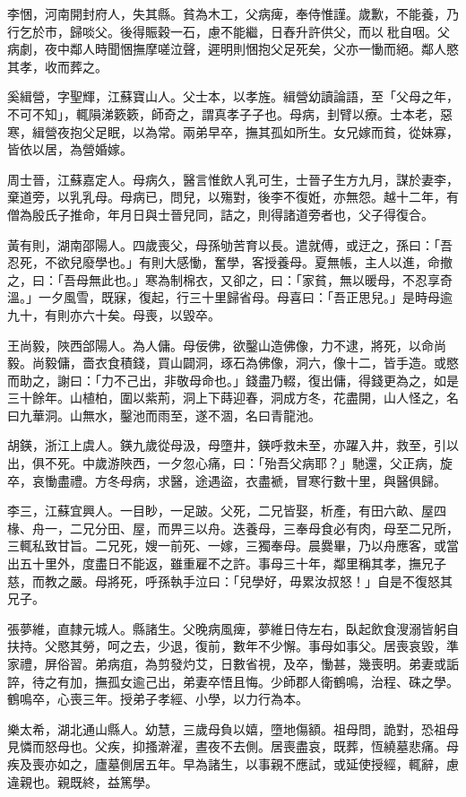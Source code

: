 \begin{pinyinscope}
李悃，河南開封府人，失其縣。貧為木工，父病痺，奉侍惟謹。歲歉，不能養，乃行乞於市，歸啖父。後得賑穀一石，慮不能繼，日舂升許供父，而以秕自咽。父病劇，夜中鄰人時聞悃撫摩嗟泣聲，遲明則悃抱父足死矣，父亦一慟而絕。鄰人愍其孝，收而葬之。

奚緝營，字聖輝，江蘇寶山人。父士本，以孝旌。緝營幼讀論語，至「父母之年，不可不知」，輒隕涕簌簌，師奇之，謂真孝子子也。母病，刲臂以療。士本老，惡寒，緝營夜抱父足眠，以為常。兩弟早卒，撫其孤如所生。女兄嫁而貧，從妹寡，皆依以居，為營婚嫁。

周士晉，江蘇嘉定人。母病久，醫言惟飲人乳可生，士晉子生方九月，謀於妻李，棄道旁，以乳乳母。母病已，問兒，以殤對，後李不復姙，亦無怨。越十二年，有僧為殷氏子推命，年月日與士晉兒同，詰之，則得諸道旁者也，父子得復合。

黃有則，湖南邵陽人。四歲喪父，母孫劬苦育以長。遣就傅，或迂之，孫曰：「吾忍死，不欲兒廢學也。」有則大感慟，奮學，客授養母。夏無帳，主人以進，命撤之，曰：「吾母無此也。」寒為制棉衣，又卻之，曰：「家貧，無以暖母，不忍享奇溫。」一夕風雪，既寐，復起，行三十里歸省母。母喜曰：「吾正思兒。」是時母逾九十，有則亦六十矣。母喪，以毀卒。

王尚毅，陜西郃陽人。為人傭。母佞佛，欲鑿山造佛像，力不逮，將死，以命尚毅。尚毅傭，嗇衣食積錢，買山闢洞，琢石為佛像，洞六，像十二，皆手造。或愍而助之，謝曰：「力不己出，非敬母命也。」錢盡乃輟，復出傭，得錢更為之，如是三十餘年。山植柏，圍以紫荊，洞上下蒔迎春，洞成方冬，花盡開，山人怪之，名曰九華洞。山無水，鑿池而雨至，遂不涸，名曰青龍池。

胡鍈，浙江上虞人。鍈九歲從母汲，母墮井，鍈呼救未至，亦躍入井，救至，引以出，俱不死。中歲游陜西，一夕忽心痛，曰：「殆吾父病耶？」馳還，父正病，旋卒，哀慟盡禮。方冬母病，求醫，途遇盜，衣盡褫，冒寒行數十里，與醫俱歸。

李三，江蘇宜興人。一目眇，一足跛。父死，二兄皆娶，析產，有田六畝、屋四椽、舟一，二兄分田、屋，而畀三以舟。迭養母，三奉母食必有肉，母至二兄所，三輒私致甘旨。二兄死，嫂一前死、一嫁，三獨奉母。晨爨畢，乃以舟應客，或當出五十里外，度盡日不能返，雖重雇不之許。事母三十年，鄰里稱其孝，撫兄子慈，而教之嚴。母將死，呼孫執手泣曰：「兒學好，毋累汝叔怒！」自是不復怒其兄子。

張夢維，直隸元城人。縣諸生。父晚病風痺，夢維日侍左右，臥起飲食溲溺皆躬自扶持。父愍其勞，呵之去，少退，復前，數年不少懈。事母如事父。居喪哀毀，準家禮，屏俗習。弟病疽，為剪發灼艾，日數省視，及卒，慟甚，幾喪明。弟妻或詬誶，待之有加，撫孤女逾己出，弟妻卒悟且悔。少師郡人衛鶴鳴，治程、硃之學。鶴鳴卒，心喪三年。授弟子孝經、小學，以力行為本。

樂太希，湖北通山縣人。幼慧，三歲母負以嬉，墮地傷額。祖母問，詭對，恐祖母見憐而怒母也。父疾，抑搔澣濯，晝夜不去側。居喪盡哀，既葬，恆繞墓悲痛。母疾及喪亦如之，廬墓側居五年。早為諸生，以事親不應試，或延使授經，輒辭，慮違親也。親既終，益篤學。


\end{pinyinscope}
